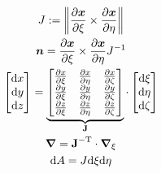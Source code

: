\documentclass[a4paper,11pt]{article}
\renewcommand{\to}[1]{\text{\boldmath $#1$}} %
\newcommand{\ts}[1]{\text{\boldmath $\rm #1$}} %
\newcommand{\intd}[1]{{\rm d}#1}
\newcommand{\pderiv}[2]{\frac{\partial#1}{\partial#2}}
\newcommand{\norm}[1]{\left\lVert{#1}\right\rVert}
\newcommand{\T}{{\rm T}}
\newcommand{\defeq}{:=}
\begin{document}
\begin{gather}
 J \defeq \norm{\pderiv{\to x}{\xi} \times  \pderiv{\to x}{\eta}}\\
 \to n = \pderiv{\to x}{\xi} \times \pderiv{\to x}{\eta} J^{-1}\\
 \begin{bmatrix}\intd x\\ \intd y\\ \intd z\end{bmatrix} =
  \underbrace{\begin{bmatrix}\pderiv{x}{\xi} & \pderiv{x}{\eta} & \pderiv{x}{\zeta}\\
	  \pderiv{y}{\xi} & \pderiv{y}{\eta} & \pderiv{y}{\zeta}\\
	  \pderiv{z}{\xi} & \pderiv{z}{\eta} & \pderiv{z}{\zeta} \end{bmatrix}}_{\ts J}
  \cdot \begin{bmatrix}\intd \xi \\ \intd \eta \\ \intd \zeta\end{bmatrix}\\
 \to\nabla = \ts J^{-\T}\cdot\to\nabla_\xi\\
 \intd A = J \intd \xi \intd \eta 
\end{gather}


\end{document}
